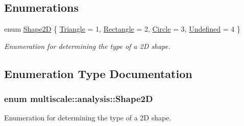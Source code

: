 \subsection*{Enumerations}
\begin{DoxyCompactItemize}
\item 
enum \hyperlink{namespacemultiscale_1_1analysis_ad1ef6155ab2e954c1c33d3e2e6b53fbf}{Shape2\-D} \{ \hyperlink{namespacemultiscale_1_1analysis_ad1ef6155ab2e954c1c33d3e2e6b53fbfaa93f37adbed49c6062576ec26eb845f7}{Triangle} = 1, 
\hyperlink{namespacemultiscale_1_1analysis_ad1ef6155ab2e954c1c33d3e2e6b53fbfa79a965ce5faa97f66ce875245491fde4}{Rectangle} = 2, 
\hyperlink{namespacemultiscale_1_1analysis_ad1ef6155ab2e954c1c33d3e2e6b53fbfabad5f35f59b929029fa140abb514a654}{Circle} = 3, 
\hyperlink{namespacemultiscale_1_1analysis_ad1ef6155ab2e954c1c33d3e2e6b53fbfa6df4f8bcba37302a9fa3d9887b2c3a13}{Undefined} = 4
 \}
\begin{DoxyCompactList}\small\item\em Enumeration for determining the type of a 2\-D shape. \end{DoxyCompactList}\end{DoxyCompactItemize}


\subsection{Enumeration Type Documentation}
\hypertarget{namespacemultiscale_1_1analysis_ad1ef6155ab2e954c1c33d3e2e6b53fbf}{
\subsubsection[{Shape2\-D}]{\setlength{\rightskip}{0pt plus 5cm}enum {\bf multiscale\-::analysis\-::\-Shape2\-D}}}\label{namespacemultiscale_1_1analysis_ad1ef6155ab2e954c1c33d3e2e6b53fbf}


Enumeration for determining the type of a 2\-D shape. 

